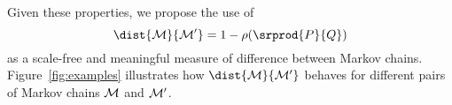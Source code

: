Given these properties, we propose the use of 
$$\dist{\cal M}{\cal M'} = 1-\rho(\srprod{P}{Q})$$ as a scale-free and meaningful  measure of difference between Markov chains. 
Figure~\ref{fig:examples} illustrates how $\dist{\cal M}{\cal M'}$ behaves for different pairs of Markov chains $\cal M$ and $\cal M'$.





